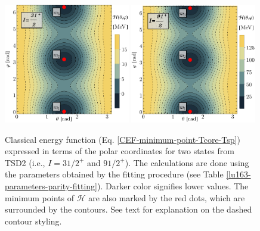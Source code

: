 \begin{figure}
    \centering
    \includegraphics[width=0.49\textwidth]{Chapters/Figures/parity-partners-plots/contour-tsd2-1.pdf}
    \includegraphics[width=0.49\textwidth]{Chapters/Figures/parity-partners-plots/contour-tsd2-2.pdf}
    \caption{Classical energy function (Eq. \ref{CEF-minimum-point-Tcore-Tsp}) expressed in terms of the polar coordinates for two states from TSD2 (i.e., $I=31/2^+$ and $91/2^+$). The calculations are done using the parameters obtained by the fitting procedure (see Table \ref{lu163-parameters-parity-fitting}). Darker color signifies lower values. The minimum points of $\mathcal{H}$ are also marked by the red dots, which are surrounded by the contours. See text for explanation on the dashed contour styling.}
    \label{contour-cef-polar-tsd2}
\end{figure}
